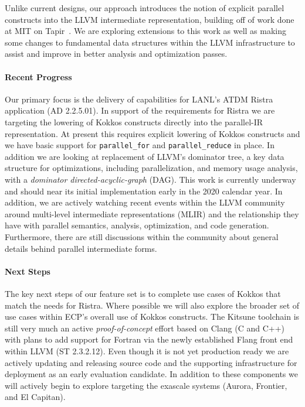 Unlike current designs, our approach introduces the notion of explicit
parallel constructs into the LLVM intermediate representation, building
off of work done at MIT on Tapir~\cite{2.3.6.01:kitsune:Schardl:2017}. 
We are exploring extensions to this work as well as making some changes
to fundamental data structures within the LLVM infrastructure to assist
and improve in better analysis and optimization passes. 

\paragraph{Recent Progress}

Our primary focus is the delivery of capabilities for LANL's ATDM
Ristra application (AD 2.2.5.01).  In support of the requirements for
Ristra we are targeting the lowering of Kokkos constructs directly
into the parallel-IR representation.  At present this requires
explicit lowering of Kokkos constructs and we have basic support
for \texttt{parallel_for} and \texttt{parallel_reduce} in place.  In
addition we are looking at replacement of LLVM's dominator tree, a key
data structure for optimizations, including parallelization, and
memory usage analysis, with a \emph{dominator directed-acyclic-graph}
(DAG).  This work is currently underway and should near its initial
implementation early in the 2020 calendar year.  In addition, we are
actively watching recent events within the LLVM community around
multi-level intermediate representations (MLIR) and the relationship
they have with parallel semantics, analysis, optimization, and code
generation.  Furthermore, there are still discussions within the
community about general details behind parallel intermediate forms. 

\paragraph{Next Steps}

The key next steps of our feature set is to complete use cases of
Kokkos that match the needs for Ristra.  Where possible we will also
explore the broader set of use cases within ECP's overall use of
Kokkos constructs.  The Kitsune toolchain is still very much an
active \emph{proof-of-concept} effort based on Clang (C and C++) with
plans to add support for Fortran via the newly established Flang front
end within LLVM (ST 2.3.2.12).  Even though it is not yet production
ready we are actively updating and releasing source code and the supporting
infrastructure for deployment as an early evaluation candidate.  In
addition to these components we will actively begin to explore targeting
the exascale systems (Aurora, Frontier, and El Capitan).

